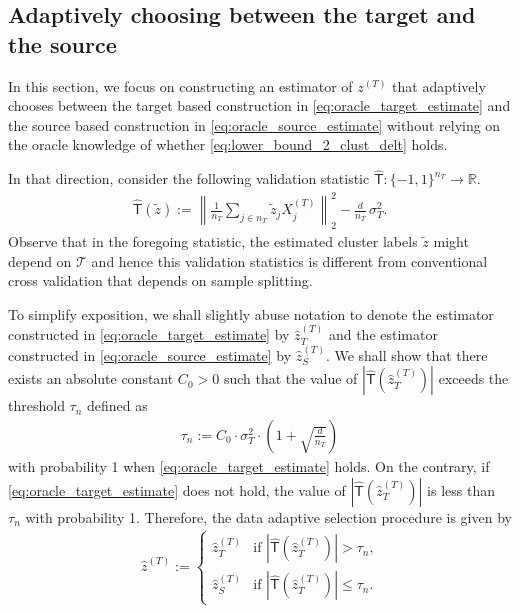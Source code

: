 \documentclass[10pt]{article}
\newcommand{\wh}{\widehat}
\newcommand{\wt}{\widetilde}
\newcommand{\calT}{\mathcal T}
\newcommand{\trg}{T}
\newcommand{\nT}{n_{\trg}}
\newcommand{\sigmaT}{\sigma_{\trg}}
\newcommand{\Xtar}{X^{(\trg)}}
\newcommand{\ztar}{z^{(\trg)}}
\newcommand{\hatztar}{\wh{z}^{(\trg)}}
\newcommand{\rmT}{\mathsf{T}}
\newcommand{\src}{S}
\begin{document}
\subsection{Adaptively choosing between the target and the source}
\label{sec:oracle_adaptive_two_cluster}
In this section, we focus on constructing an estimator of $\ztar$ that adaptively chooses between the target based construction in \eqref{eq:oracle_target_estimate} and the source based construction in \eqref{eq:oracle_source_estimate} without relying on the oracle knowledge of whether \eqref{eq:lower_bound_2_clust_delt} holds. 

In that direction, consider the following validation statistic $\wh{\rmT}:\{-1,1\}^{\nT} \to \mathbb R$.
\begin{align}
    \label{eq:validation_statistic}
   \wh{\rmT}(\wt z):=\left\|\frac{1}{\nT}\sum_{j \in \nT}\wt z_j\Xtar_j\right\|^2_2-\frac{d}{\nT}\,\sigmaT^2.
\end{align}
Observe that in the foregoing statistic, the estimated cluster labels $\wt z$ might depend on $\calT$ and hence this validation statistics is different from conventional cross validation that depends on sample splitting. 

To simplify exposition, we shall slightly abuse notation to denote the estimator constructed in \eqref{eq:oracle_target_estimate} by $\hatztar_{\trg}$ and the estimator constructed in \eqref{eq:oracle_source_estimate} by $\hatztar_{\src}$.
We shall show that there exists an absolute constant $C_0>0$ such that the value of $|\wh{\rmT}(\hatztar_T)|$ exceeds the threshold $\tau_n$ defined as
\begin{align}
    \label{eq:validation_threshold}
   \tau_n:=C_0\cdot\sigmaT^2\cdot\left(1+\sqrt{\frac{d}{\nT}}\right)
\end{align}
with probability 1 when \eqref{eq:oracle_target_estimate} holds. On the contrary, if \eqref{eq:oracle_target_estimate} does not hold, the value of $|\wh{\rmT}(\hatztar_T)|$ is less than $\tau_n$ with probability 1. Therefore, the data adaptive selection procedure is given by
\begin{align}
\label{eq:grand_def_adaptive}
    \hatztar:=\begin{cases}
        \hatztar_{\trg} & \mbox{if $|\wh{\rmT}(\hatztar_{\trg})|>\tau_n$,}\\
        \hatztar_{\src} & \mbox{if $|\wh{\rmT}(\hatztar_{\trg})|\le\tau_n$.}
    \end{cases}
\end{align}
\end{document}
